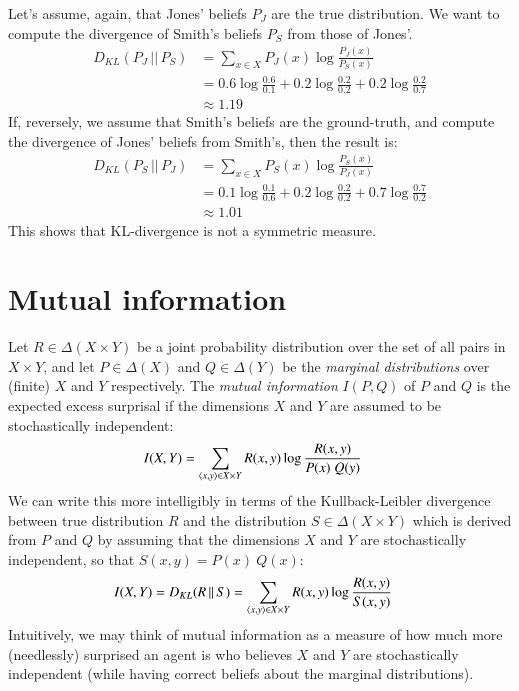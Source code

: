 \documentclass[nobib,nofonts]{tufte-handout}
\begin{document}
\begin{example}
  Let's assume, again, that Jones' beliefs $P_{J}$ are the true distribution.
  We want to compute the divergence of Smith's beliefs $P_{S}$ from those of Jones'.
  \begin{align*}
    D_{KL}(P_{J} \,||\, P_{S}) & = \sum_{x \in X} P_{J}(x) \log  \frac{P_{J}(x)}{P_{S}(x)} \\
                               & = 0.6 \log \frac{0.6}{0.1} +
                                 0.2 \log \frac{0.2}{0.2} +
                                 0.2 \log \frac{0.2}{0.7} \\
    & \approx 1.19
  \end{align*}
  If, reversely, we assume that Smith's beliefs are the ground-truth, and compute the divergence of Jones' beliefs from Smith's, then the result is:
  \begin{align*}
    D_{KL}(P_{S} \,||\, P_{J}) & = \sum_{x \in X} P_{S}(x) \log  \frac{P_{S}(x)}{P_{J}(x)} \\
                               & = 0.1 \log \frac{0.1}{0.6} +
                                   0.2 \log \frac{0.2}{0.2} +
                                   0.7 \log \frac{0.7}{0.2} \\
    & \approx 1.01
  \end{align*}
  This shows that KL-divergence is not a symmetric measure.
\end{example}


\section{Mutual information}

Let $R \in \Delta(X \times Y)$ be a joint probability distribution over the set of all pairs in $X \times Y$, and let $P \in \Delta(X)$ and $Q \in \Delta(Y)$ be the \emph{marginal distributions} over (finite) $X$ and $Y$ respectively.
The \emph{mutual information} $I(P,Q)$ of $P$ and $Q$ is the expected excess surprisal if the dimensions $X$ and $Y$ are assumed to be stochastically independent:
\begin{align*}
  I(X,Y) & = \sum_{\left \langle x,y\right\rangle \in X \times Y} R(x,y) \log \frac{R(x,y)}{P(x) \ Q(y)}
\end{align*}
We can write this more intelligibly in terms of the Kullback-Leibler divergence between true distribution $R$ and the distribution $S \in \Delta(X \times Y)$ which is derived from $P$ and $Q$ by assuming that the dimensions $X$ and $Y$ are stochastically independent, so that $S(x,y) = P(x) \ Q(x)$:
\begin{align*}
  I(X,Y) & =  D_{KL}(R \,||\, S) = \sum_{\left \langle x,y\right\rangle \in X \times Y} R(x,y) \log \frac{R(x,y)}{S(x,y)}
\end{align*}
Intuitively, we may think of mutual information as a measure of how much more (needlessly) surprised an agent is who believes $X$ and $Y$ are stochastically independent (while having correct beliefs about the marginal distributions).
\end{document}
